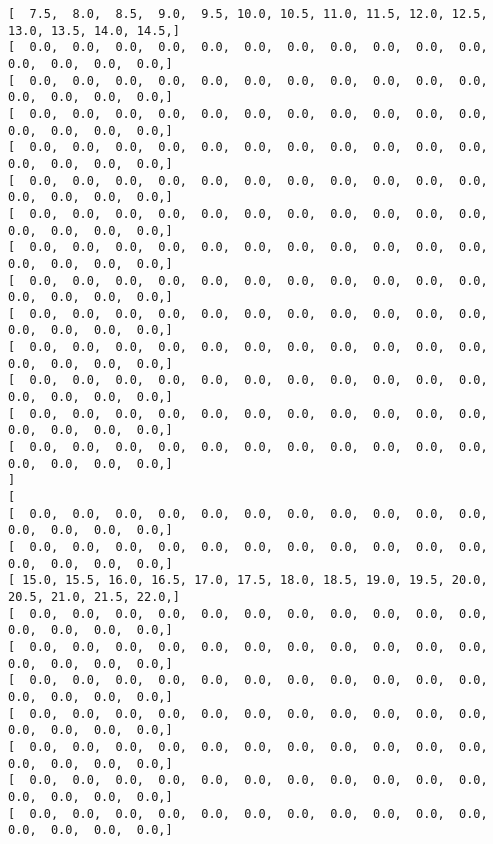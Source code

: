 \documentclass[11pt]{article}
\begin{document}
\begin{Verbatim}[commandchars=\\\{\}]
[   7.5,   8.0,   8.5,   9.0,   9.5,  10.0,  10.5,  11.0,  11.5,  12.0,  12.5,  13.0,  13.5,  14.0,  14.5, ]
[   0.0,   0.0,   0.0,   0.0,   0.0,   0.0,   0.0,   0.0,   0.0,   0.0,   0.0,   0.0,   0.0,   0.0,   0.0, ]
[   0.0,   0.0,   0.0,   0.0,   0.0,   0.0,   0.0,   0.0,   0.0,   0.0,   0.0,   0.0,   0.0,   0.0,   0.0, ]
[   0.0,   0.0,   0.0,   0.0,   0.0,   0.0,   0.0,   0.0,   0.0,   0.0,   0.0,   0.0,   0.0,   0.0,   0.0, ]
[   0.0,   0.0,   0.0,   0.0,   0.0,   0.0,   0.0,   0.0,   0.0,   0.0,   0.0,   0.0,   0.0,   0.0,   0.0, ]
[   0.0,   0.0,   0.0,   0.0,   0.0,   0.0,   0.0,   0.0,   0.0,   0.0,   0.0,   0.0,   0.0,   0.0,   0.0, ]
[   0.0,   0.0,   0.0,   0.0,   0.0,   0.0,   0.0,   0.0,   0.0,   0.0,   0.0,   0.0,   0.0,   0.0,   0.0, ]
[   0.0,   0.0,   0.0,   0.0,   0.0,   0.0,   0.0,   0.0,   0.0,   0.0,   0.0,   0.0,   0.0,   0.0,   0.0, ]
[   0.0,   0.0,   0.0,   0.0,   0.0,   0.0,   0.0,   0.0,   0.0,   0.0,   0.0,   0.0,   0.0,   0.0,   0.0, ]
[   0.0,   0.0,   0.0,   0.0,   0.0,   0.0,   0.0,   0.0,   0.0,   0.0,   0.0,   0.0,   0.0,   0.0,   0.0, ]
[   0.0,   0.0,   0.0,   0.0,   0.0,   0.0,   0.0,   0.0,   0.0,   0.0,   0.0,   0.0,   0.0,   0.0,   0.0, ]
[   0.0,   0.0,   0.0,   0.0,   0.0,   0.0,   0.0,   0.0,   0.0,   0.0,   0.0,   0.0,   0.0,   0.0,   0.0, ]
[   0.0,   0.0,   0.0,   0.0,   0.0,   0.0,   0.0,   0.0,   0.0,   0.0,   0.0,   0.0,   0.0,   0.0,   0.0, ]
[   0.0,   0.0,   0.0,   0.0,   0.0,   0.0,   0.0,   0.0,   0.0,   0.0,   0.0,   0.0,   0.0,   0.0,   0.0, ]
]
[
[   0.0,   0.0,   0.0,   0.0,   0.0,   0.0,   0.0,   0.0,   0.0,   0.0,   0.0,   0.0,   0.0,   0.0,   0.0, ]
[   0.0,   0.0,   0.0,   0.0,   0.0,   0.0,   0.0,   0.0,   0.0,   0.0,   0.0,   0.0,   0.0,   0.0,   0.0, ]
[  15.0,  15.5,  16.0,  16.5,  17.0,  17.5,  18.0,  18.5,  19.0,  19.5,  20.0,  20.5,  21.0,  21.5,  22.0, ]
[   0.0,   0.0,   0.0,   0.0,   0.0,   0.0,   0.0,   0.0,   0.0,   0.0,   0.0,   0.0,   0.0,   0.0,   0.0, ]
[   0.0,   0.0,   0.0,   0.0,   0.0,   0.0,   0.0,   0.0,   0.0,   0.0,   0.0,   0.0,   0.0,   0.0,   0.0, ]
[   0.0,   0.0,   0.0,   0.0,   0.0,   0.0,   0.0,   0.0,   0.0,   0.0,   0.0,   0.0,   0.0,   0.0,   0.0, ]
[   0.0,   0.0,   0.0,   0.0,   0.0,   0.0,   0.0,   0.0,   0.0,   0.0,   0.0,   0.0,   0.0,   0.0,   0.0, ]
[   0.0,   0.0,   0.0,   0.0,   0.0,   0.0,   0.0,   0.0,   0.0,   0.0,   0.0,   0.0,   0.0,   0.0,   0.0, ]
[   0.0,   0.0,   0.0,   0.0,   0.0,   0.0,   0.0,   0.0,   0.0,   0.0,   0.0,   0.0,   0.0,   0.0,   0.0, ]
[   0.0,   0.0,   0.0,   0.0,   0.0,   0.0,   0.0,   0.0,   0.0,   0.0,   0.0,   0.0,   0.0,   0.0,   0.0, ]

\end{Verbatim}
\end{document}
